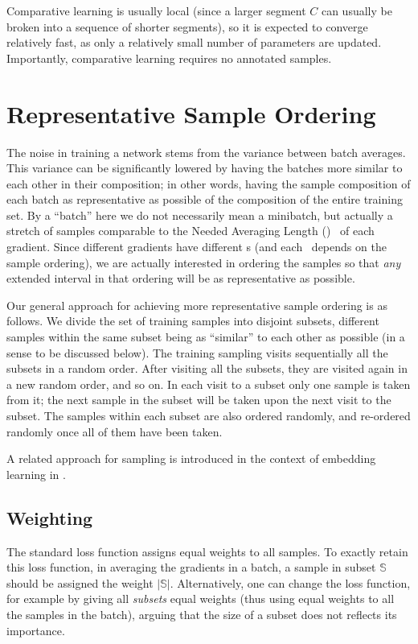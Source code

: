 \documentclass{article} %
\begin{document}
Comparative learning is usually local (since a larger segment $C$ can usually be broken into a sequence of shorter segments), so it is expected to converge relatively fast, as only a relatively small number of parameters are updated. Importantly, comparative learning requires no annotated samples.


\section{Representative Sample Ordering}
\label{sec:ordering}
The noise in training a network stems from the variance between batch averages. This variance can be significantly lowered by having the batches more similar to each other in their composition; in other words, having the sample composition of each batch as representative as possible of the composition of the entire training set. By a ``batch'' here we do not necessarily mean a minibatch, but actually a stretch of samples comparable to the Needed Averaging Length (\NAL)~ of each gradient. 
Since different gradients have different {\NAL}s (and each \NAL~depends on the sample ordering), we are actually interested in ordering the samples so that \emph{any} extended interval in that ordering will be as representative as possible.

Our general approach for achieving more representative sample ordering is as follows. We divide the set of training samples into disjoint subsets, different samples within the same subset being as ``similar'' to each other as possible (in a sense to be discussed below). The training sampling visits sequentially all the subsets in a random order. After visiting all the subsets, they are visited again in a new random order, and so on. In each visit to a subset only one sample is taken from it; the next sample in the subset will be taken upon the next visit to the subset. The samples within each subset are also ordered randomly, and re-ordered randomly once all of them have been taken.

A related approach for sampling is introduced in the context of embedding learning in \cite{WMSK}.

\subsection{Weighting}
The standard loss function assigns equal weights to all samples. To exactly retain this loss function, in averaging the gradients in a batch, a sample in subset $\mathbb{S}$ should be assigned the weight $|\mathbb{S}|$. Alternatively, one can change the loss function, for example by giving all \emph{subsets} equal weights (thus using equal weights to all the samples in the batch), arguing that the size of a subset does not reflects its importance. 
\end{document}
